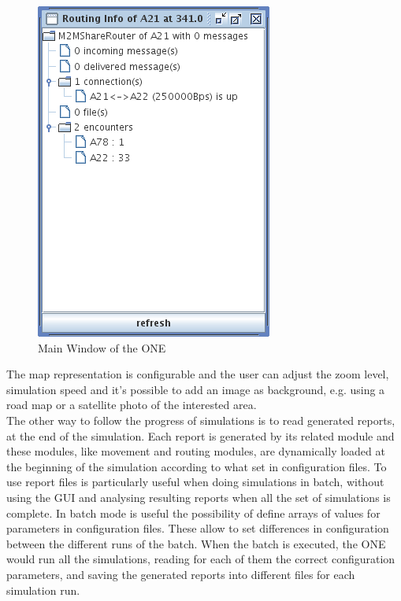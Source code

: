 \begin{figure}[htpb]
  \begin{center}
    \includegraphics[scale=0.6]{2-simulatore/img/Routing-Info.png}
    \caption[Routing Info]{Main Window of the ONE}    
    \label{Routing-Info}
  \end{center}
\end{figure}

The map representation is configurable and the user can adjust the zoom level, simulation speed and it's possible to add an image as background, e.g. using a road map or a satellite photo of the interested area.
\\

The other way to follow the progress of simulations is to read generated reports, at the end of the simulation. Each report is generated by its related module and these modules, like movement and routing modules, are dynamically loaded at the beginning of the simulation according to what set in configuration files. To use report files is particularly useful when doing simulations in batch, without using the GUI and analysing resulting reports when all the set of simulations is complete. In batch mode is useful the possibility of define arrays of values for parameters in configuration files. These allow to set differences in configuration between the different runs of the batch. When the batch is executed, the ONE would run all the simulations, reading for each of them the correct configuration parameters, and saving the generated reports into different files for each simulation run.
\\

